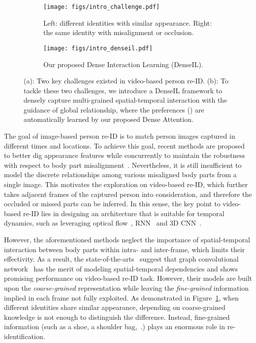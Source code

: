 \documentclass[10pt,twocolumn,letterpaper]{article}
\begin{document}
\begin{figure}[ht]
	\centering
	\begin{subfigure}{.45\textwidth}
		\centering
		\texttt{[image: figs/intro\_challenge.pdf]}
		\caption{Left: different identities with similar appearance. Right: the same identity with misalignment or occlusion.}
		\label{fig:intro_challenge}
	\end{subfigure}\vspace{2mm}
	\begin{subfigure}{.475\textwidth}
		\centering
		\texttt{[image: figs/intro\_denseil.pdf]}
		\caption{Our proposed Dense Interaction Learning (DenseIL).}
		\label{fig:intro_denseil}
	\end{subfigure}
	\vspace{-3mm}
	\caption{(a): Two key challenges existed in video-based person re-ID. (b): To tackle these two challenges, we introduce a DenseIL framework to densely capture multi-grained spatial-temporal interaction with the guidance of global relationship, where the preferences () are automatically learned by our proposed Dense Attention.}
	\vspace{-3mm}
\end{figure}

The goal of image-based person re-ID is to match person images captured in different times and locations. To achieve this goal, recent methods are proposed to better dig appearance features while concurrently to maintain the robustness with respect to body part misalignment~\cite{li2015multi,qian2017multi,chang2018multi,zhou2019omni,wei2017glad,sun2018beyond,wang2018learning,jin2020semantics,jin2020style,he2021partial}. Nevertheless, it is still insufficient to model the discrete relationships among various misaligned body parts from a single image. This motivates the exploration on video-based re-ID, which further takes adjacent frames of the captured person into consideration, and therefore the occluded or missed parts can be inferred. In this sense, the key point to video-based re-ID lies in designing an architecture that is suitable for temporal dynamics, such as leveraging optical flow~\cite{chen2020temporal}, RNN~\cite{zhou2017see} and 3D CNN~\cite{li2019multi}.

However, the aforementioned methods neglect the importance of spatial-temporal interaction between body parts within intra- and inter-frame, which limits their effectivity. As a result, the state-of-the-arts~\cite{yang2020spatial,yan2020learning} suggest that graph convolutional network~\cite{kipf2016semi} has the merit of modeling spatial-temporal dependencies and shows promising performance on video-based re-ID task. However, their models are built upon the \emph{coarse-grained} representation while leaving the \emph{fine-grained} information implied in each frame not fully exploited.
As demonstrated in Figure~\ref{fig:intro_challenge}, when different identities share similar appearance, depending on coarse-grained knowledge is not enough to distinguish the difference. Instead, fine-grained information (such as a shoe, a shoulder bag,~\etc.) plays an enormous role in re-identification.
\end{document}
